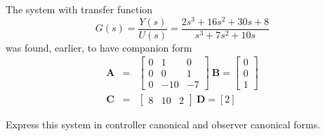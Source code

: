 The system with transfer function
\[G(s)=\frac{Y(s)}{U(s)}=\frac{2s^3 + 16s^2 + 30s + 8}{s^3 + 7s^2 + 10s}\]
was found, earlier, to have companion form
\begin{eqnarray*}\mathbf{A} & = & \left[\begin{array}{ccc}
  0 & 1 & 0 \\
  0 & 0 & 1 \\
  0 & -10 & -7
\end{array}\right]\ \mathbf{B}=\left[\begin{array}{c}
  0 \\
  0 \\
  1
\end{array}\right]\\ \mathbf{C} & = & \left[\begin{array}{ccc}
  8 & 10 & 2
\end{array}\right]\ \mathbf{D}=\left[2\right]\end{eqnarray*}

Express this system in controller canonical and observer canonical forms.
\endinput
